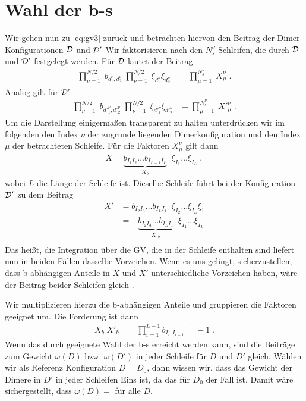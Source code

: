 \section{Wahl der b-s}
Wir gehen nun zu \eqref{eq:gv3} zurück und betrachten hiervon den Beitrag der Dimer Konfigurationen ${\cal D}$ und ${\cal D}'$
Wir faktorisieren nach den $N_s^\nu$ Schleifen,
die durch ${\cal D}$ und  ${\cal D}'$ festgelegt werden. Für ${\cal D}$ lautet der Beitrag
\begin{align*}
\prod_{\nu=1}^{N/2}\;b_{d^\nu_1,d^\nu_2}  \; \prod_{\nu=1}^{N/2}\;\xi_{d^\nu_1}\xi_{d^\nu_2} &=
\prod_{\mu=1}^{N^\nu_s}\;
X_\mu^\nu\;.
\end{align*}
%
Analog gilt für ${\cal D}'$
\begin{align*}
\prod_{\nu=1}^{N/2}\;b_{{d'}^\nu_1,{d'}^\nu_2}  \; \prod_{\nu=1}^{N/2}\;\xi_{{d'}^\nu_1}\xi_{{d'}^\nu_2} &=
\prod_{\mu=1}^{N^\nu_s}\;
{X'}_\mu^\nu\;.
\end{align*}
Um die Darstellung einigermaßen transparent zu halten unterdrücken wir im folgenden den Index $\nu$ der zugrunde liegenden Dimerkonfiguration
und den Index $\mu$ der betrachteten Schleife. Für die
Faktoren $X_\mu^\nu$ gilt dann
\begin{align*}
    X = \underbrace{b_{I_1 I_2}\ldots b_{I_{L-1}I_L}}_{X_b}\;\;\xi_{I_1}\ldots\xi_{I_L}\;,
\end{align*}
wobei $L$ die Länge der Schleife ist.
Dieselbe Schleife führt bei der Konfiguration ${\cal D}'$ zu dem Beitrag
\begin{align*}
    X' &= b_{I_2 I_3}\ldots b_{I_{L}I_1}\;\;\xi_{I_2}\ldots\xi_{I_L}\xi_{1}\\
    &= - \underbrace{b_{I_2 I_3}\ldots b_{I_{L}I_1}}_{{X'}_b}\;\;\xi_{I_1}\ldots\xi_{I_L}\\
\end{align*}
Das heißt, die Integration über die GV, die in der Schleife enthalten sind liefert nun in beiden Fällen dasselbe Vorzeichen.
Wenn es uns gelingt, sicherzustellen, dass b-abhängigen Anteile in $X$ und $X'$ unterschiedliche Vorzeichen haben, wäre der Beitrag beider Schleifen 
gleich .




Wir multiplizieren hierzu die b-abhängigen Anteile und gruppieren die Faktoren geeignet um. Die Forderung ist dann
\begin{align*} 
    X_b \;{X'}_b &= \prod_{i=1}^{L-1} b_{I_i,I_{i+1}} \overset{!}{=} -1\;.
\end{align*}
Wenn das durch geeignete Wahl der b-s erreicht werden kann, sind die Beiträge zum Gewicht $\omega(D)$ bzw. $\omega(D')$ in jeder Schleife für $D$ und $D'$
gleich. Wählen wir als Referenz Konfiguration $D=D_0$, dann wissen wir, dass das Gewicht der Dimere in $D'$ in jeder Schleifen  Eins ist, da das für $D_0$
der Fall ist. Damit wäre sichergestellt, dass $\omega(D)=$ für alle $D$.

